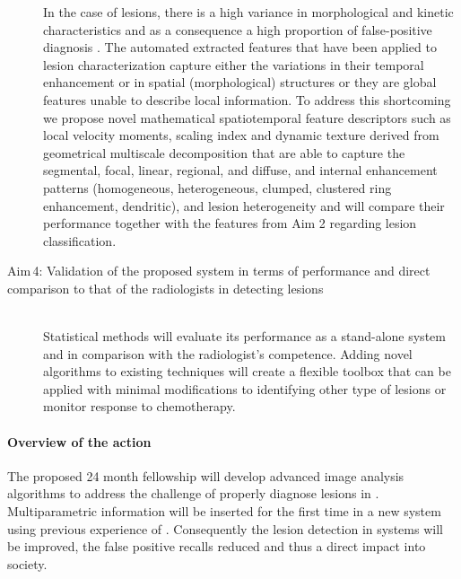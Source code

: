 \begin{description}
  In the case of \nmle lesions, there is a high variance in morphological and
  kinetic characteristics and as a consequence a high proportion of
  false-positive diagnosis . The automated extracted features
  that have been applied to lesion characterization capture either the
  variations in their temporal enhancement or in spatial (morphological)
  structures or they are global features unable to describe local information.
  To address this shortcoming we propose novel mathematical spatiotemporal
  feature descriptors such as local velocity moments, scaling index and dynamic
  texture derived from geometrical multiscale decomposition that are able to
  capture the segmental, focal, linear, regional, and diffuse, and internal
  enhancement patterns (homogeneous, heterogeneous, clumped, clustered ring
  enhancement, dendritic), and lesion heterogeneity and will compare their
  performance together with the features from Aim 2 regarding lesion
  classification.

  \item [Aim\,4: Validation of the proposed system in terms of performance and direct comparison
to that of the radiologists in detecting lesions]
  \hfill \\

  Statistical methods will evaluate its performance as a stand-alone system and
  in comparison with the radiologist’s competence. Adding novel algorithms to
  existing techniques will create a flexible toolbox that can be applied with
  minimal modifications to identifying other type of lesions or monitor
  response to chemotherapy.

\end{description}

\paragraph{Overview of the action}

The proposed 24 month fellowship will develop advanced image analysis algorithms to address the challenge of properly diagnose \nmle lesions in \mri.
Multiparametric \mri information will be inserted for the first time in a new \cad system using previous experience of \vicorob. Consequently the lesion detection in \cad systems will be improved, the false positive recalls reduced and thus a direct impact into society.

